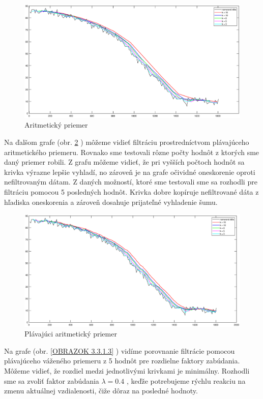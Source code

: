 \begin{figure}
	\centering
	\includegraphics[width=170mm]{obr/aritmeticky.eps}
	\caption{Aritmetický priemer}\label{OBRAZOK 3.3.1.1} 
\end{figure}

Na ďalšom grafe (obr. \ref{OBRAZOK 3.3.1.2} ) môžeme vidieť filtráciu prostredníctvom plávajúceho aritmetického priemeru. Rovnako sme testovali rôzne počty hodnôt z ktorých sme daný priemer robili. Z grafu môžeme vidieť, že pri vyšších počtoch hodnôt sa krivka výrazne lepšie vyhladí, no zároveň je na grafe očividné oneskorenie oproti nefiltrovaným dátam. Z daných možností, ktoré sme testovali sme sa rozhodli pre filtráciu pomocou 5 posledných hodnôt. Krivka dobre kopíruje nefiltrované dáta z hľadiska oneskorenia a zároveň dosahuje prijateľné vyhladenie šumu.

\begin{figure}
	\centering
	\includegraphics[width=170mm]{obr/plavajuciAritmeticky.eps}
	\caption{Plávajúci aritmetický priemer}\label{OBRAZOK 3.3.1.2} 
\end{figure}

Na grafe (obr. \ref{OBRAZOK 3.3.1.3} ) vidíme porovnanie filtrácie pomocou plávajúceho váženého priemeru z 5 hodnôt pre rozdielne faktory zabúdania. Môžeme vidieť, že rozdiel medzi jednotlivými krivkami je minimálny. Rozhodli sme sa zvoliť faktor zabúdania $\lambda = 0.4$ , keďže potrebujeme rýchlu reakciu na zmenu aktuálnej vzdialenosti, čiže dôraz na posledné hodnoty.

